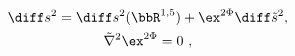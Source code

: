 \begin{equation}
\label{NSinK3}
\begin{gathered}
   \diff s^2 =  
       \diff s^2 (\bbR^{1,5}) + \ex^{2\Phi}\diff \tilde{s}^2 , \\
   \tilde\nabla^2 \ex^{2\Phi} =  0~,
\end{gathered}
\end{equation}


